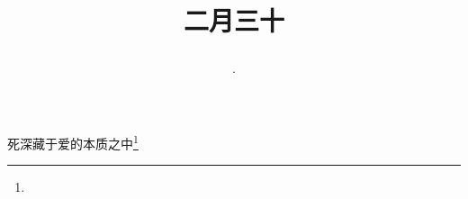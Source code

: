 \title{\date[d=8,m=4,y=2024][year:cn-y,年,month:cn,day:cn,日,·,weekday]·二月三十 }
死深藏于爱的本质之中\footnote{ }

